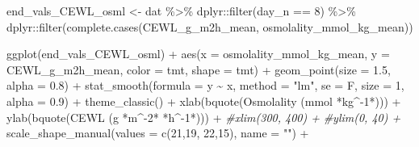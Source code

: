 \documentclass[
]{article}
\newenvironment{Shaded}{\begin{snugshade}}{\end{snugshade}}
\newcommand{\AttributeTok}[1]{\textcolor[rgb]{0.77,0.63,0.00}{#1}}
\newcommand{\CommentTok}[1]{\textcolor[rgb]{0.56,0.35,0.01}{\textit{#1}}}
\newcommand{\DecValTok}[1]{\textcolor[rgb]{0.00,0.00,0.81}{#1}}
\newcommand{\FloatTok}[1]{\textcolor[rgb]{0.00,0.00,0.81}{#1}}
\newcommand{\FunctionTok}[1]{\textcolor[rgb]{0.00,0.00,0.00}{#1}}
\newcommand{\NormalTok}[1]{#1}
\newcommand{\OtherTok}[1]{\textcolor[rgb]{0.56,0.35,0.01}{#1}}
\newcommand{\SpecialCharTok}[1]{\textcolor[rgb]{0.00,0.00,0.00}{#1}}
\newcommand{\StringTok}[1]{\textcolor[rgb]{0.31,0.60,0.02}{#1}}
\begin{document}
\begin{Shaded}
\begin{Highlighting}[]
\NormalTok{end\_vals\_CEWL\_osml }\OtherTok{\textless{}{-}}\NormalTok{ dat }\SpecialCharTok{\%\textgreater{}\%}
\NormalTok{  dplyr}\SpecialCharTok{::}\FunctionTok{filter}\NormalTok{(day\_n }\SpecialCharTok{==} \DecValTok{8}\NormalTok{) }\SpecialCharTok{\%\textgreater{}\%}
\NormalTok{  dplyr}\SpecialCharTok{::}\FunctionTok{filter}\NormalTok{(}\FunctionTok{complete.cases}\NormalTok{(CEWL\_g\_m2h\_mean, osmolality\_mmol\_kg\_mean))}

\FunctionTok{ggplot}\NormalTok{(end\_vals\_CEWL\_osml) }\SpecialCharTok{+} 
  \FunctionTok{aes}\NormalTok{(}\AttributeTok{x =}\NormalTok{ osmolality\_mmol\_kg\_mean,}
      \AttributeTok{y =}\NormalTok{ CEWL\_g\_m2h\_mean,}
      \AttributeTok{color =}\NormalTok{ tmt,}
      \AttributeTok{shape =}\NormalTok{ tmt) }\SpecialCharTok{+}
  \FunctionTok{geom\_point}\NormalTok{(}\AttributeTok{size =} \FloatTok{1.5}\NormalTok{, }
             \AttributeTok{alpha =} \FloatTok{0.8}\NormalTok{) }\SpecialCharTok{+} 
  \FunctionTok{stat\_smooth}\NormalTok{(}\AttributeTok{formula =}\NormalTok{ y }\SpecialCharTok{\textasciitilde{}}\NormalTok{ x, }
              \AttributeTok{method =} \StringTok{"lm"}\NormalTok{, }
              \AttributeTok{se =}\NormalTok{ F, }
              \AttributeTok{size =} \DecValTok{1}\NormalTok{, }
              \AttributeTok{alpha =} \FloatTok{0.9}\NormalTok{) }\SpecialCharTok{+} 
  \FunctionTok{theme\_classic}\NormalTok{() }\SpecialCharTok{+} 
  \FunctionTok{xlab}\NormalTok{(}\FunctionTok{bquote}\NormalTok{(}\StringTok{\textquotesingle{}Osmolality (mmol \textquotesingle{}}\SpecialCharTok{*}\NormalTok{kg}\SpecialCharTok{\^{}{-}}\DecValTok{1}\SpecialCharTok{*}\StringTok{\textquotesingle{})\textquotesingle{}}\NormalTok{)) }\SpecialCharTok{+} 
  \FunctionTok{ylab}\NormalTok{(}\FunctionTok{bquote}\NormalTok{(}\StringTok{\textquotesingle{}CEWL (g \textquotesingle{}}\SpecialCharTok{*}\NormalTok{m}\SpecialCharTok{\^{}{-}}\DecValTok{2}\SpecialCharTok{*}\StringTok{\textquotesingle{} \textquotesingle{}}\SpecialCharTok{*}\NormalTok{h}\SpecialCharTok{\^{}{-}}\DecValTok{1}\SpecialCharTok{*}\StringTok{\textquotesingle{})\textquotesingle{}}\NormalTok{)) }\SpecialCharTok{+} 
  \CommentTok{\#xlim(300, 400) +}
  \CommentTok{\#ylim(0, 40) +}
  \FunctionTok{scale\_shape\_manual}\NormalTok{(}\AttributeTok{values =} \FunctionTok{c}\NormalTok{(}\DecValTok{21}\NormalTok{,}\DecValTok{19}\NormalTok{, }\DecValTok{22}\NormalTok{,}\DecValTok{15}\NormalTok{), }\AttributeTok{name =} \StringTok{""}\NormalTok{) }\SpecialCharTok{+}

\end{Highlighting}
\end{Shaded}
\end{document}

